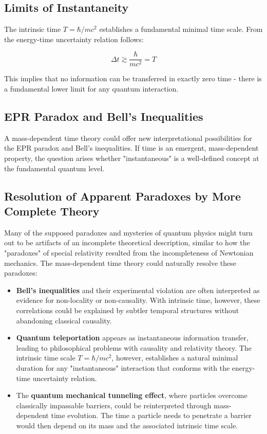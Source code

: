 \documentclass[12pt,a4paper]{article}  %
\begin{document}
	\subsection{Limits of Instantaneity}
	
	The intrinsic time $T = \hbar/mc^2$ establishes a fundamental minimal time scale. From the energy-time uncertainty relation follows:
	
	\begin{equation}
		\Delta t \gtrsim \frac{\hbar}{mc^2} = T
	\end{equation}
	
	This implies that no information can be transferred in exactly zero time - there is a fundamental lower limit for any quantum interaction.
	
	\subsection{EPR Paradox and Bell's Inequalities}
	
	A mass-dependent time theory could offer new interpretational possibilities for the EPR paradox and Bell's inequalities. If time is an emergent, mass-dependent property, the question arises whether "instantaneous" is a well-defined concept at the fundamental quantum level.
	
	\subsection{Resolution of Apparent Paradoxes by More Complete Theory}
	
	Many of the supposed paradoxes and mysteries of quantum physics might turn out to be artifacts of an incomplete theoretical description, similar to how the "paradoxes" of special relativity resulted from the incompleteness of Newtonian mechanics. The mass-dependent time theory could naturally resolve these paradoxes:
	
	\begin{itemize}
		\item \textbf{Bell's inequalities} and their experimental violation are often interpreted as evidence for non-locality or non-causality. With intrinsic time, however, these correlations could be explained by subtler temporal structures without abandoning classical causality.
		
		\item \textbf{Quantum teleportation} appears as instantaneous information transfer, leading to philosophical problems with causality and relativity theory. The intrinsic time scale $T = \hbar/mc^2$, however, establishes a natural minimal duration for any "instantaneous" interaction that conforms with the energy-time uncertainty relation.
		
		\item The \textbf{quantum mechanical tunneling effect}, where particles overcome classically impassable barriers, could be reinterpreted through mass-dependent time evolution. The time a particle needs to penetrate a barrier would then depend on its mass and the associated intrinsic time scale.
	\end{itemize}
	
\end{document}
